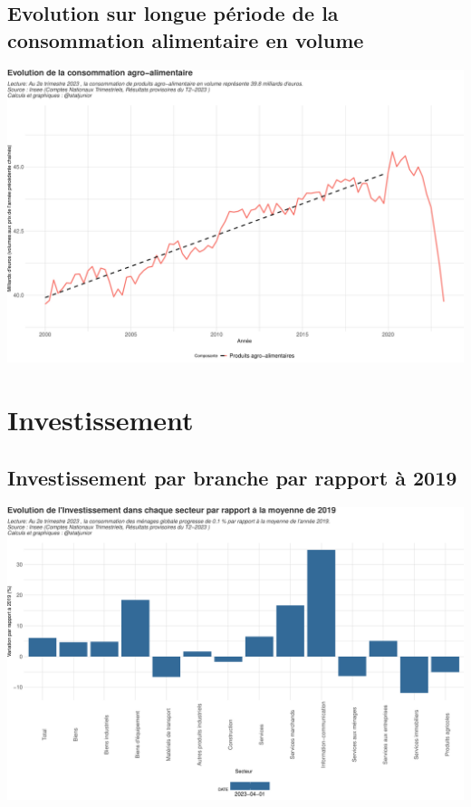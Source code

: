 \documentclass[
  paper=a4,
  ,captions=tableheading
]{scrartcl}
\begin{document}
\hypertarget{evolution-sur-longue-puxe9riode-de-la-consommation-alimentaire-en-volume}{%
\subsection{Evolution sur longue période de la consommation alimentaire
en
volume}\label{evolution-sur-longue-puxe9riode-de-la-consommation-alimentaire-en-volume}}

\includegraphics{rapport_pdf_compte_branche_files/figure-latex/unnamed-chunk-13-1.pdf}

\newpage

\hypertarget{investissement}{%
\section{Investissement}\label{investissement}}

\hypertarget{investissement-par-branche-par-rapport-uxe0-2019}{%
\subsection{Investissement par branche par rapport à
2019}\label{investissement-par-branche-par-rapport-uxe0-2019}}

\includegraphics{rapport_pdf_compte_branche_files/figure-latex/unnamed-chunk-15-1.pdf}
\end{document}
